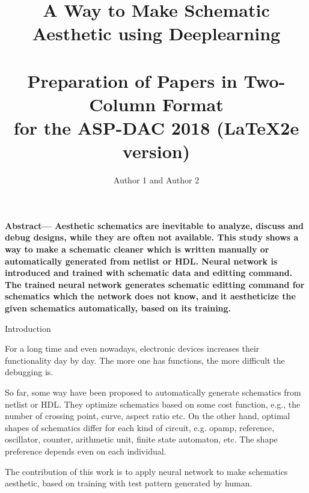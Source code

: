 \documentclass[twocolumn]{article}
\makeatletter
\def\section{\@startsection {section}{1}{\z@}{20pt plus 2pt minus 2pt}
{8pt plus 2pt minus 2pt}{\centering\normalsize\sc
\edef\@svsec{\thesection.\ }}}
\def\thesection{\Roman{section}}
\makeatother
\begin{document}
\date{}

\title{\Large\textbf{A Way to Make Schematic Aesthetic using Deeplearning}\\~\\
\large\textbf{
Preparation of Papers in Two-Column Format\\
for the ASP-DAC 2018 (\LaTeX2e version)}}	%


\author{Author 1 and Author 2}
\maketitle
\thispagestyle{empty}

{\small\textbf{Abstract---
 Aesthetic schematics are inevitable to analyze, discuss and debug designs,
while they are often not available.
 This study shows a way to make a schematic cleaner which is written manually
 or automatically generated from netlist or HDL.
 Neural network is introduced and trained with schematic data and
 editting command.
 The trained neural network generates schematic editting command for schematics
 which the network does not know, and it aestheticize the given schematics
 automatically, based on its training.
}}

\section{Introduction}

For a long time and even nowadays,
electronic devices increases their functionality day by day.
The more one has functions, the more difficult the debugging is.

So far, some way have been proposed to automatically generate schematics
from netlist or HDL.
They optimize schematics based on some cost function, e.g.,
the number of crossing point, curve, aspect ratio etc.
On the other hand, optimal shapes of schematics differ for each kind of
circuit, e.g. opamp, reference, oscillator, counter, arithmetic unit,
finite state automaton, etc.
The shape preference depends even on each individual.

The contribution of this work is to apply neural network to make schematics
aesthetic, based on training with test pattern generated by human.
\end{document}
